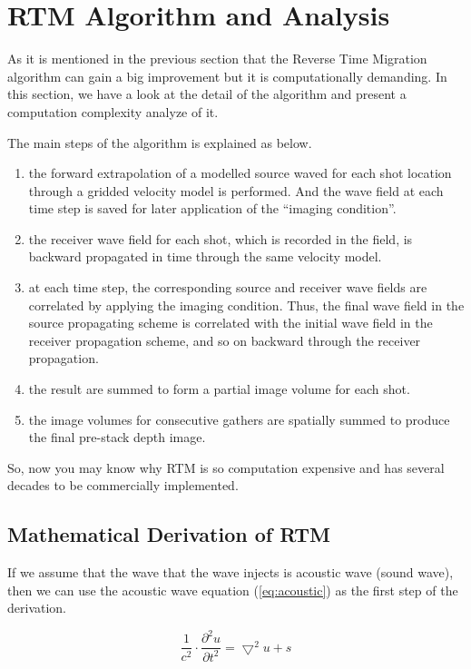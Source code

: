 \section{RTM Algorithm and Analysis}

As it is mentioned in the previous section that the Reverse Time Migration
algorithm can gain a big improvement but it is computationally demanding.
In this section, we have a look at the detail of the algorithm and present
a computation complexity analyze of it.

The main steps of the algorithm is explained as below\cite{rtm}.

\begin{enumerate}
\item the forward extrapolation of a modelled source waved for each shot
  location through a gridded velocity model is performed. And the wave
  field at each time step is saved for later application of the ``imaging
  condition''.
\item the receiver wave field for each shot, which is recorded in the
  field, is backward propagated in time through the same velocity model.
\item at each time step, the corresponding source and receiver wave fields
  are correlated by applying the imaging condition. Thus, the final
  wave field in the source propagating scheme is correlated with the
  initial wave field in the receiver propagation scheme, and so on backward
  through the receiver propagation.
\item the result are summed to form a partial image volume for each shot.
\item the image volumes for consecutive gathers are spatially summed to
  produce the final pre-stack depth image.
\end{enumerate}

So, now you may know why RTM is so computation expensive and has several
decades to be commercially implemented.

\subsection{Mathematical Derivation of RTM}

If we assume that the wave that the wave injects is acoustic wave (sound
wave), then we can use the acoustic wave equation (\ref{eq:acoustic}) as
the first step of the derivation.

\begin{equation}
  \frac{1}{c^2}\cdot\frac{\partial ^2u}{\partial t^2}=\bigtriangledown ^2u +s
  \label{eq:acoustic}
\end{equation}

